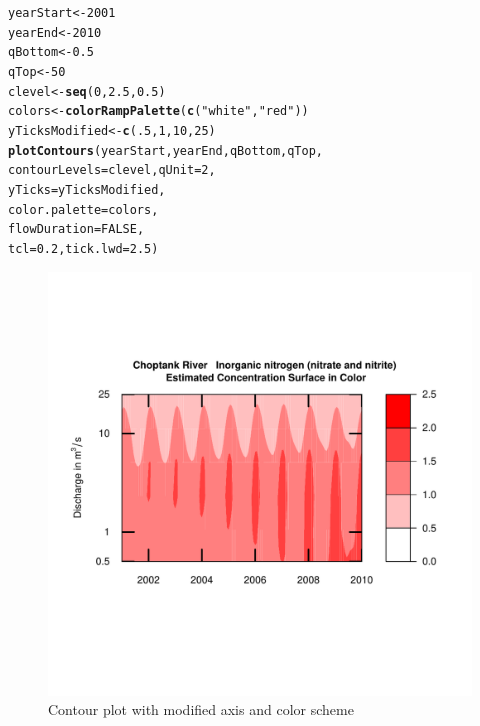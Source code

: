 \documentclass[a4paper,11pt]{article}\usepackage[]{graphicx}\usepackage[]{color}
\makeatletter
\newcommand{\hlnum}[1]{\textcolor[rgb]{0.686,0.059,0.569}{#1}}%
\newcommand{\hlstr}[1]{\textcolor[rgb]{0.192,0.494,0.8}{#1}}%
\newcommand{\hlstd}[1]{\textcolor[rgb]{0.345,0.345,0.345}{#1}}%
\newcommand{\hlkwb}[1]{\textcolor[rgb]{0.69,0.353,0.396}{#1}}%
\newcommand{\hlkwc}[1]{\textcolor[rgb]{0.333,0.667,0.333}{#1}}%
\newcommand{\hlkwd}[1]{\textcolor[rgb]{0.737,0.353,0.396}{\textbf{#1}}}%
\newenvironment{kframe}{%
 \def\at@end@of@kframe{}%
 \ifinner\ifhmode%
  \def\at@end@of@kframe{\end{minipage}}%
  \begin{minipage}{\columnwidth}%
 \fi\fi%
 \def\FrameCommand##1{\hskip\@totalleftmargin \hskip-\fboxsep
 \colorbox{shadecolor}{##1}\hskip-\fboxsep
     \hskip-\linewidth \hskip-\@totalleftmargin \hskip\columnwidth}%
 \MakeFramed {\advance\hsize-\width
   \@totalleftmargin\z@ \linewidth\hsize
   \@setminipage}}%
 {\par\unskip\endMakeFramed%
 \at@end@of@kframe}
\newenvironment{knitrout}{}{} %
\makeatother
\begin{document}
\begin{knitrout}
\color{fgcolor}\begin{kframe}
\begin{alltt}
\hlstd{yearStart} \hlkwb{<-} \hlnum{2001}
\hlstd{yearEnd} \hlkwb{<-} \hlnum{2010}
\hlstd{qBottom} \hlkwb{<-} \hlnum{0.5}
\hlstd{qTop}\hlkwb{<-} \hlnum{50}
\hlstd{clevel} \hlkwb{<-} \hlkwd{seq}\hlstd{(}\hlnum{0}\hlstd{,}\hlnum{2.5}\hlstd{,}\hlnum{0.5}\hlstd{)}
\hlstd{colors} \hlkwb{<-} \hlkwd{colorRampPalette}\hlstd{(}\hlkwd{c}\hlstd{(}\hlstr{"white"}\hlstd{,}\hlstr{"red"}\hlstd{))}
\hlstd{yTicksModified} \hlkwb{<-} \hlkwd{c}\hlstd{(}\hlnum{.5}\hlstd{,}\hlnum{1}\hlstd{,}\hlnum{10}\hlstd{,}\hlnum{25}\hlstd{)}
\hlkwd{plotContours}\hlstd{(yearStart,yearEnd,qBottom,qTop,}
             \hlkwc{contourLevels} \hlstd{= clevel,}\hlkwc{qUnit}\hlstd{=}\hlnum{2}\hlstd{,}
             \hlkwc{yTicks}\hlstd{=yTicksModified,}
             \hlkwc{color.palette}\hlstd{=colors,}
             \hlkwc{flowDuration}\hlstd{=}\hlnum{FALSE}\hlstd{,}
             \hlkwc{tcl}\hlstd{=}\hlnum{0.2}\hlstd{,}\hlkwc{tick.lwd}\hlstd{=}\hlnum{2.5}\hlstd{)}
\end{alltt}
\end{kframe}\begin{figure}[]

\includegraphics[width=1\linewidth,height=1\linewidth]{figure/modifiedContour1} \caption[Contour plot with modified axis and color scheme]{Contour plot with modified axis and color scheme\label{fig:modifiedContour1}}
\end{figure}


\end{knitrout}
\end{document}
